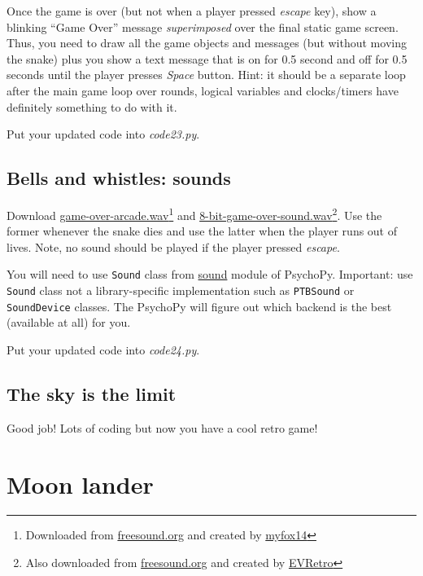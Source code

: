 \documentclass[
]{book}
\begin{document}
Once the game is over (but not when a player pressed \emph{escape} key), show a blinking ``Game Over'' message \emph{superimposed} over the final static game screen. Thus, you need to draw all the game objects and messages (but without moving the snake) plus you show a text message that is on for 0.5 second and off for 0.5 seconds until the player presses \emph{Space} button. Hint: it should be a separate loop after the main game loop over rounds, logical variables and clocks/timers have definitely something to do with it.

Put your updated code into \emph{code23.py}.

\hypertarget{bells-and-whistles-sounds}{%
\section{Bells and whistles: sounds}\label{bells-and-whistles-sounds}}

Download \href{material/game-over-arcade.wav}{game-over-arcade.wav}\footnote{Downloaded from \href{https://freesound.org/}{freesound.org} and created by \href{https://freesound.org/people/myfox14/}{myfox14}} and \href{material/8-bit-game-over-sound.wav}{8-bit-game-over-sound.wav}\footnote{Also downloaded from \href{https://freesound.org/}{freesound.org} and created by \href{https://freesound.org/people/EVRetro/}{EVRetro}}. Use the former whenever the snake dies and use the latter when the player runs out of lives. Note, no sound should be played if the player pressed \emph{escape}.

You will need to use \texttt{Sound} class from \href{https://psychopy.org/api/sound/playback.html}{sound} module of PsychoPy. Important: use \texttt{Sound} class not a library-specific implementation such as \texttt{PTBSound} or \texttt{SoundDevice} classes. The PsychoPy will figure out which backend is the best (available at all) for you.

Put your updated code into \emph{code24.py}.

\hypertarget{the-sky-is-the-limit}{%
\section{The sky is the limit}\label{the-sky-is-the-limit}}

Good job! Lots of coding but now you have a cool retro game!

\hypertarget{moon-lander}{%
\chapter{Moon lander}\label{moon-lander}}
\end{document}
